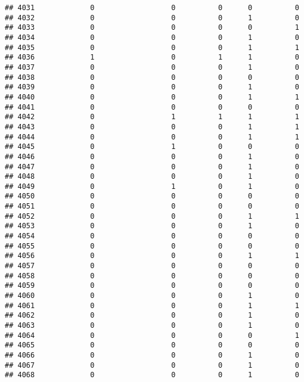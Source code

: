 \documentclass[
]{article}
\begin{document}
\begin{verbatim}
## 4031             0                  0          0      0          0
## 4032             0                  0          0      1          0
## 4033             0                  0          0      0          1
## 4034             0                  0          0      1          0
## 4035             0                  0          0      1          1
## 4036             1                  0          1      1          0
## 4037             0                  0          0      1          0
## 4038             0                  0          0      0          0
## 4039             0                  0          0      1          0
## 4040             0                  0          0      1          1
## 4041             0                  0          0      0          0
## 4042             0                  1          1      1          1
## 4043             0                  0          0      1          1
## 4044             0                  0          0      1          1
## 4045             0                  1          0      0          0
## 4046             0                  0          0      1          0
## 4047             0                  0          0      1          0
## 4048             0                  0          0      1          0
## 4049             0                  1          0      1          0
## 4050             0                  0          0      0          0
## 4051             0                  0          0      0          0
## 4052             0                  0          0      1          1
## 4053             0                  0          0      1          0
## 4054             0                  0          0      0          0
## 4055             0                  0          0      0          0
## 4056             0                  0          0      1          1
## 4057             0                  0          0      0          0
## 4058             0                  0          0      0          0
## 4059             0                  0          0      0          0
## 4060             0                  0          0      1          0
## 4061             0                  0          0      1          1
## 4062             0                  0          0      1          0
## 4063             0                  0          0      1          0
## 4064             0                  0          0      0          1
## 4065             0                  0          0      0          0
## 4066             0                  0          0      1          0
## 4067             0                  0          0      1          0
## 4068             0                  0          0      1          0

\end{verbatim}
\end{document}
